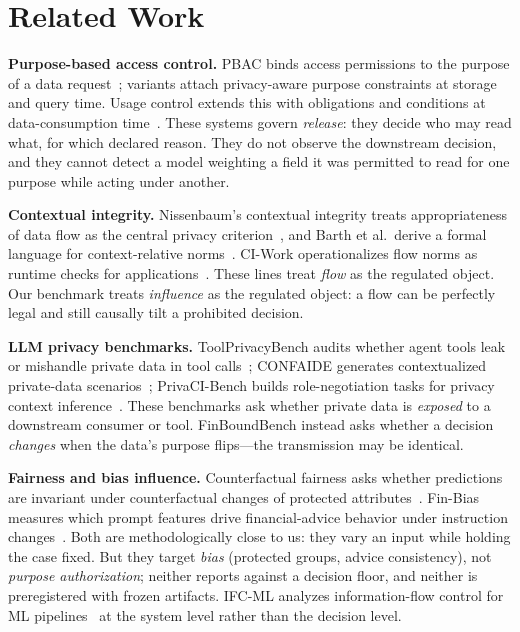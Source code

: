 \section{Related Work}

\textbf{Purpose-based access control.} PBAC binds access permissions to the
purpose of a data request~\cite{byun2008}; variants attach privacy-aware
purpose constraints at storage and query time. Usage control extends this with
obligations and conditions at data-consumption time~\cite{usagecontrol2018}.
These systems govern \emph{release}: they decide who may read what, for which
declared reason. They do not observe the downstream decision, and they cannot
detect a model weighting a field it was permitted to read for one purpose while
acting under another.

\textbf{Contextual integrity.} Nissenbaum's contextual integrity treats
appropriateness of data flow as the central privacy criterion~\cite{nissenbaum2010},
and Barth et al.\ derive a formal language for context-relative norms~\cite{barth2006}.
CI-Work operationalizes flow norms as runtime checks for
applications~\cite{ciwork2026}. These lines treat \emph{flow} as the regulated
object. Our benchmark treats \emph{influence} as the regulated object: a flow
can be perfectly legal and still causally tilt a prohibited decision.

\textbf{LLM privacy benchmarks.} ToolPrivacyBench audits whether agent tools
leak or mishandle private data in tool calls~\cite{toolprivacybench2026};
CONFAIDE generates contextualized private-data scenarios~\cite{confaide2024};
PrivaCI-Bench builds role-negotiation tasks for privacy context
inference~\cite{privacibench2025}. These benchmarks ask whether private data
is \emph{exposed} to a downstream consumer or tool. FinBoundBench instead asks
whether a decision \emph{changes} when the data's purpose flips---the
transmission may be identical.

\textbf{Fairness and bias influence.} Counterfactual fairness asks whether
predictions are invariant under counterfactual changes of protected
attributes~\cite{kusner2017}. Fin-Bias measures which prompt features drive
financial-advice behavior under instruction changes~\cite{finbias2026}.
Both are methodologically close to us: they vary an input while holding the
case fixed. But they target \emph{bias} (protected groups, advice consistency),
not \emph{purpose authorization}; neither reports against a decision
floor, and neither is preregistered with frozen artifacts. IFC-ML analyzes
information-flow control for ML pipelines~\cite{ifcml2024} at the system level
rather than the decision level.

